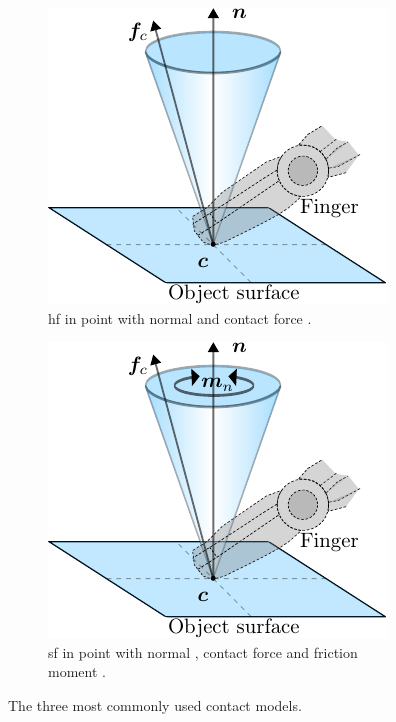\begin{figure}[h]
\begin{subfigure}[b]{0.3\textwidth}
		\includegraphics[width=\textwidth]{chapters/modeling/fig/hf-crop.pdf}
		\caption{\gls{hf} in point  with normal  and contact force .}
		\label{fig:hf}
	\end{subfigure}
	\hfill
	\begin{subfigure}[b]{0.3\textwidth}
		\centering
		\includegraphics[width=\textwidth]{chapters/modeling/fig/sf-crop.pdf}
		\caption{\gls{sf} in point  with normal , contact force  and friction moment .}
		\label{fig:sf}
	\end{subfigure}
	   \caption{The three most commonly used contact models.}
	   \label{fig:contact-models}
\end{figure}


